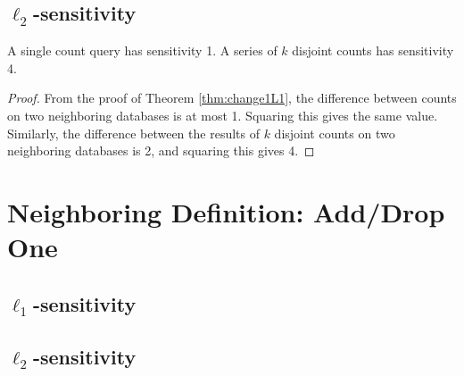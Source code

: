 \documentclass[11pt]{scrartcl} %
\begin{document}
\subsection{$\ell_2$-sensitivity}

\begin{theorem}
A single count query has sensitivity 1. A series of $k$ disjoint counts has sensitivity 4.
\end{theorem}

\begin{proof}
From the proof of Theorem \ref{thm:change1L1}, the difference between counts on two neighboring databases is at most 1. Squaring this gives the same value. Similarly, the difference between the results of $k$ disjoint counts on two neighboring databases is 2, and squaring this gives 4. 
\end{proof}

\section{Neighboring Definition: Add/Drop One}
\subsection{$\ell_1$-sensitivity}

\subsection{$\ell_2$-sensitivity}

% 
% 
\end{document}
